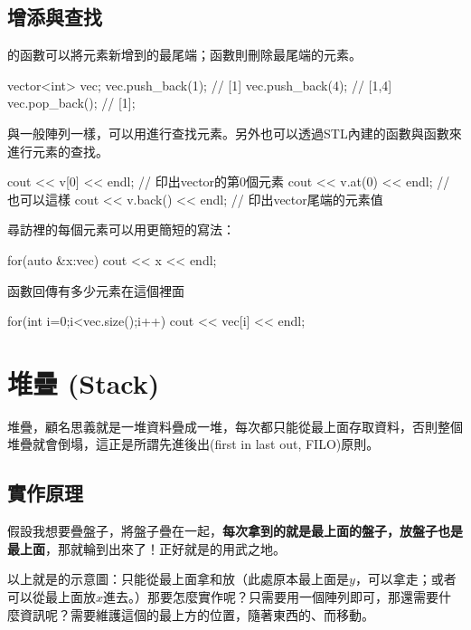 \documentclass[main.tex]{subfiles}
\begin{document}
\subsection{增添與查找}
的函數可以將元素新增到的最尾端；函數則刪除最尾端的元素。
\begin{C++}
vector<int> vec;
vec.push_back(1); // [1]
vec.push_back(4); // [1,4]
vec.pop_back(); // [1];
\end{C++}
\indent\indent{}與一般陣列一樣，可以用進行查找元素。另外也可以透過STL內建的函數與函數來進行元素的查找。
\begin{C++}
cout << v[0] << endl;
// 印出vector的第0個元素
cout << v.at(0) << endl;
// 也可以這樣
cout << v.back() << endl;
// 印出vector尾端的元素值
\end{C++}
\indent\indent 尋訪裡的每個元素可以用更簡短的寫法：
\begin{C++}
for(auto &x:vec){
	cout << x << endl;
}
\end{C++}
\indent\indent{}函數回傳有多少元素在這個裡面
\begin{C++}
for(int i=0;i<vec.size();i++)
	cout << vec[i] << endl;
\end{C++}

\section{堆疊 (Stack)}

堆疊，顧名思義就是一堆資料疊成一堆，每次都只能從最上面存取資料，否則整個堆疊就會倒塌，這正是所謂先進後出(first in last out, FILO)原則。

\subsection{實作原理}
假設我想要疊盤子，將盤子疊在一起，\textbf{每次拿到的就是最上面的盤子，放盤子也是最上面}，那就輪到出來了！正好就是的用武之地。
\begin{center}
\end{center}
以上就是的示意圖：只能從最上面拿和放（此處原本最上面是$y$，可以拿走；或者可以從最上面放$x$進去。）那要怎麼實作呢？只需要用一個陣列即可，那還需要什麼資訊呢？需要維護這個的最上方的位置，隨著東西的、而移動。
\end{document}
